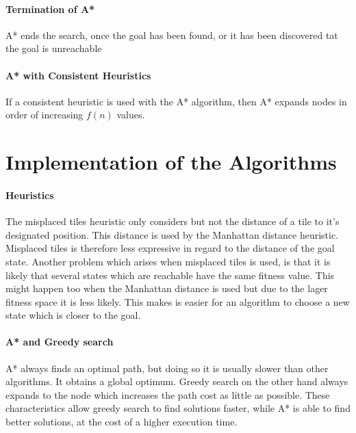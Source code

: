 \documentclass[a4paper,headsepline,12pt]{scrartcl}
\begin{document}
\paragraph{Termination of A*} A* ends the search, once the goal has been found, or it has been discovered tat the goal is unreachable
\paragraph{A* with Consistent Heuristics}
If a consistent heuristic is used with the A* algorithm, then A* expands nodes in order of increasing \(f(n)\) values.


\section{Implementation of the Algorithms}
\paragraph{Heuristics}
The misplaced tiles heuristic only considers but not the distance of a tile to it's designated position. This distance is used by the Manhattan distance heuristic. Misplaced tiles is therefore less expressive in regard to the distance of the goal state. Another problem which arises when misplaced tiles is used, is that it is likely that several states which are reachable have the same fitness value. This might happen too when the Manhattan distance is used but due to the lager fitness space it is less likely. This makes is easier for an algorithm to choose a new state which is closer to the goal.  

\paragraph{A* and Greedy search}
A* always finds an optimal path, but doing so it is usually slower than other algorithms. It obtains a global optimum. Greedy search on the other hand always expands to the node which increases the path cost as little as possible. These characteristics allow greedy search to find solutions faster, while A* is able to find better solutions, at the cost of a higher execution time.
\end{document}
